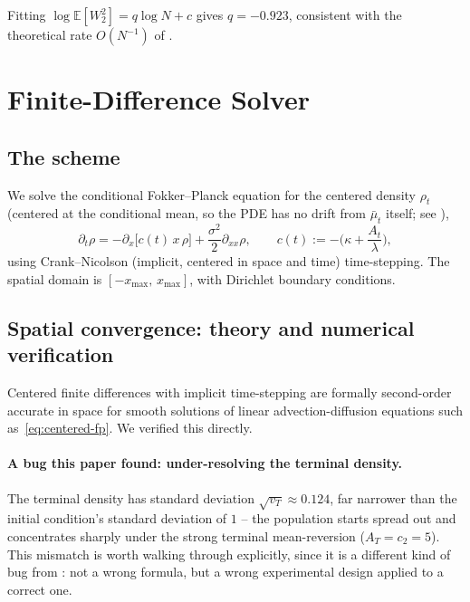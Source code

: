 \documentclass[11pt]{article}
\theoremstyle{remark}
\begin{document}
Fitting $\log\mathbb{E}[W_2^2] = q\log N + c$ gives $q = -0.923$, consistent with
the theoretical rate $O(N^{-1})$ of .

\section{Finite-Difference Solver}
\label{sec:fd-solver}

\subsection{The scheme}

We solve the conditional Fokker--Planck equation for the centered density $\rho_t$
(centered at the conditional mean, so the PDE has no drift from $\bar\mu_t$
itself; see ),
\begin{equation}
    \partial_t \rho = -\partial_x\big[c(t)\,x\,\rho\big] + \frac{\sigma^2}{2}
    \partial_{xx}\rho, \qquad c(t) := -\Big(\kappa+\frac{A_t}{\lambda}\Big),
    \label{eq:centered-fp}
\end{equation}
using Crank--Nicolson (implicit, centered in space and time) time-stepping. The
spatial domain is $[-x_{\max},\, x_{\max}]$, with Dirichlet boundary conditions.

\subsection{Spatial convergence: theory and numerical verification}

Centered finite differences with implicit time-stepping are formally second-order
accurate in space for smooth solutions of linear advection-diffusion equations
such as~\eqref{eq:centered-fp}. We verified this directly.

\paragraph{A bug this paper found: under-resolving the terminal density.} The
terminal density has standard deviation $\sqrt{v_T} \approx 0.124$, far narrower
than the initial condition's standard deviation of $1$ -- the population starts
spread out and concentrates sharply under the strong terminal mean-reversion
($A_T=c_2=5$). This mismatch is worth walking through explicitly, since it is a
different kind of bug from : not a wrong formula, but
a wrong experimental design applied to a correct one.
\end{document}
